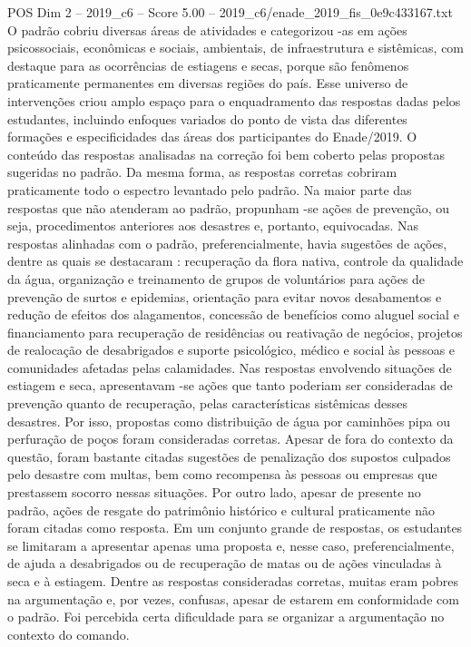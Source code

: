 \begin{textsample}{POS Dim 2 – 2019\_c6 – Score 5.00 – 2019\_c6/enade\_2019\_fis\_0e9c433167.txt}
O padrão cobriu diversas áreas de atividades e categorizou -as em ações psicossociais, econômicas e sociais, ambientais, de infraestrutura e sistêmicas, com destaque para as ocorrências de estiagens e secas, porque são fenômenos praticamente permanentes em diversas regiões do país.
Esse universo de intervenções criou amplo espaço para o enquadramento das respostas dadas pelos estudantes, incluindo enfoques variados do ponto de vista das diferentes formações e especificidades das áreas dos participantes do Enade/2019.
O conteúdo das respostas analisadas na correção foi bem coberto pelas propostas sugeridas no padrão.
Da mesma forma, as respostas corretas cobriram praticamente todo o espectro levantado pelo padrão.
Na maior parte das respostas que não atenderam ao padrão, propunham -se ações de prevenção, ou seja, procedimentos anteriores aos desastres e, portanto, equivocadas.
Nas respostas alinhadas com o padrão, preferencialmente, havia sugestões de ações, dentre as quais se destacaram : recuperação da flora nativa, controle da qualidade da água, organização e treinamento de grupos de voluntários para ações de prevenção de surtos e epidemias, orientação para evitar novos desabamentos e redução de efeitos dos alagamentos, concessão de benefícios como aluguel social e financiamento para recuperação de residências ou reativação de negócios, projetos de realocação de desabrigados e suporte psicológico, médico e social às pessoas e comunidades afetadas pelas calamidades.
Nas respostas envolvendo situações de estiagem e seca, apresentavam -se ações que tanto poderiam ser consideradas de prevenção quanto de recuperação, pelas características sistêmicas desses desastres.
Por isso, propostas como distribuição de água por caminhões pipa ou perfuração de poços foram consideradas corretas.
Apesar de fora do contexto da questão, foram bastante citadas sugestões de penalização dos supostos culpados pelo desastre com multas, bem como recompensa às pessoas ou empresas que prestassem socorro nessas situações.
Por outro lado, apesar de presente no padrão, ações de resgate do patrimônio histórico e cultural praticamente não foram citadas como resposta.
Em um conjunto grande de respostas, os estudantes se limitaram a apresentar apenas uma proposta e, nesse caso, preferencialmente, de ajuda a desabrigados ou de recuperação de matas ou de ações vinculadas à seca e à estiagem.
Dentre as respostas consideradas corretas, muitas eram pobres na argumentação e, por vezes, confusas, apesar de estarem em conformidade com o padrão.
Foi percebida certa dificuldade para se organizar a argumentação no contexto do comando.

\end{textsample}
